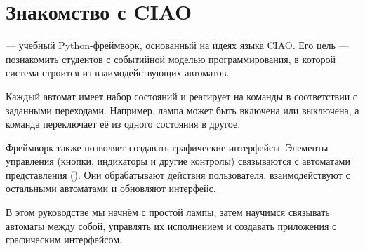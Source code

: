 \chapter{Знакомство с CIAO}
\label{chap:introduction}

\CIAO{} --- учебный Python-фреймворк, основанный на идеях
языка CIAO. Его цель --- познакомить студентов с событийной
моделью программирования, в которой система строится из
взаимодействующих автоматов.

Каждый автомат имеет набор состояний и реагирует на команды
в соответствии с заданными переходами. Например, лампа
может быть включена или выключена, а команда переключает
её из одного состояния в другое.

Фреймворк также позволяет создавать графические интерфейсы.
Элементы управления (кнопки, индикаторы и другие контролы)
связываются с автоматами представления ().
Они обрабатывают действия пользователя, взаимодействуют
с остальными автоматами и обновляют интерфейс.

В этом руководстве мы начнём с простой лампы,
затем научимся связывать автоматы между собой,
управлять их исполнением и создавать приложения
с графическим интерфейсом.

